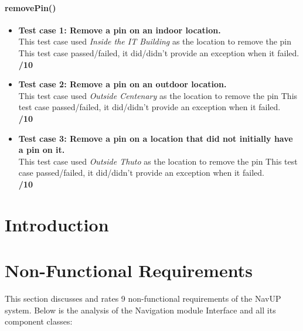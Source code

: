 \documentclass[runningheads,a4paper]{article}
\begin{document}
	\paragraph{removePin()}
		\begin{itemize}
			\item \textbf{Test case 1: Remove a pin on an indoor location.} \\
				This test case used \textit{Inside the IT Building} as the location to remove the pin
				This test case passed/failed, it did/didn't provide an exception when it failed.
			\\ \textbf{/10}
			\item \textbf{Test case 2: Remove a pin on an outdoor location.} \\
				This test case used \textit{Outside Centenary} as the location to remove the pin
				This test case passed/failed, it did/didn't provide an exception when it failed.
			\\ \textbf{/10}
			\item \textbf{Test case 3: Remove a pin on a location that did not initially have a pin on it.} \\
				This test case used \textit{Outside Thuto} as the location to remove the pin
				This test case passed/failed, it did/didn't provide an exception when it failed.
			\\ \textbf{/10}

		\end{itemize}
	
\newpage

\section{Introduction}

	\section{Non-Functional Requirements}
	
	This section discusses and rates 9 non-functional requirements of the NavUP system.
	Below is the analysis of the Navigation module Interface and all its component classes:
	
\end{document}
